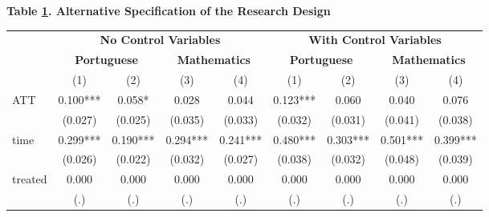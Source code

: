 \documentclass[a4paper, 12pt]{article}
\begin{document}
             \begin{table}[h]                                    \label{table:AlternativeSpecification}                        \centering            \textbf{Table \ref{table:AlternativeSpecification}. Alternative Specification of the Research Design} \\             
\begin{adjustbox}{max width=\textwidth}          
\begin{tabular}{@{\extracolsep{4pt}}l*{8}{c}@{}}             \toprule             & \multicolumn{4}{c}{\textbf{No Control Variables}} &            \multicolumn{4}{c}{\textbf{With Control Variables}} \\            \cline{2-5}              \cline{6-9}                    & \multicolumn{2}{c}{\textbf{Portuguese}} &                    \multicolumn{2}{c}{\textbf{Mathematics}} &                    \multicolumn{2}{c}{\textbf{Portuguese}} &            \multicolumn{2}{c}{\textbf{Mathematics}} \\            \cline{2-3}                    \cline{4-5}                    \cline{6-7}            \cline{8-9}          
                    &         (1)   &         (2)   &         (3)   &         (4)   &         (1)   &         (2)   &         (3)   &         (4)   \\
\hline
ATT                 &      0.100***   &      0.058*   &      0.028   &      0.044   &      0.123***   &   0.060      &   0.040      &        0.076 \\
                    &    (0.027)   &    (0.025)   &    (0.035)   &    (0.033)   &   (0.032)    &  (0.031)     &   (0.041)    &  (0.038)     \\
time                 &      0.299***   &      0.190***   &      0.294***   &      0.241***   &      0.480***   &   0.303***      &   0.501***      &        0.399*** \\
                    &    (0.026)   &    (0.022)   &    (0.032)   &    (0.027)   &   (0.038)    &  (0.032)     &   (0.048)    &  (0.039)     \\
treated                 &      0.000   &      0.000   &      0.000   &      0.000   &      0.000   &  0.000      &   0.000      &        0.000 \\
                    &    (.)   &    (.)   &    (.)   &    (.)   &   (.)    &  (.)     &   (.)    &  (.)     \\

\end{tabular}
\end{adjustbox}
\end{table}
\end{document}
